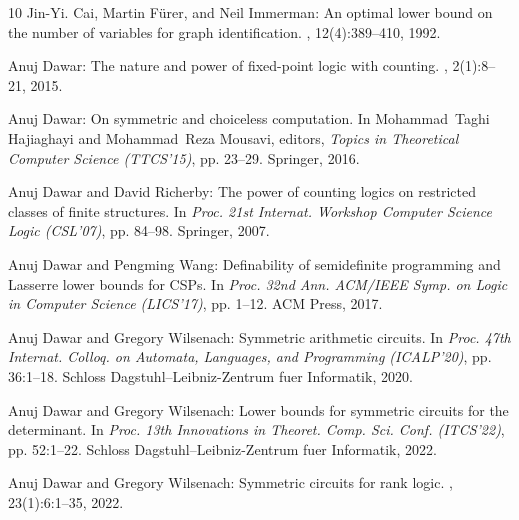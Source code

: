 \documentclass[11pt]{article}
\begin{document}
\begin{thebibliography}{10}
{\sc Jin-Yi. Cai, Martin F\"{u}rer, and Neil Immerman}: An optimal lower bound
  on the number of variables for graph identification.
, 12(4):389--410, 1992.
\newblock [\epfmtdoi{10.1007/BF01305232}]

{\sc Anuj Dawar}: The nature and power of fixed-point logic with counting.
, 2(1):8--21, 2015.
\newblock [\epfmtdoi{10.1145/2728816.2728820}]

{\sc Anuj Dawar}: On symmetric and choiceless computation.
\newblock In {\sc Mohammad~Taghi Hajiaghayi and Mohammad~Reza Mousavi},
  editors, {\em Topics in Theoretical Computer Science (TTCS'15)}, pp. 23--29.
  Springer, 2016.
\newblock [\epfmtdoi{10.1007/978-3-319-28678-5\_2}]

{\sc Anuj Dawar and David Richerby}: The power of counting logics on restricted
  classes of finite structures.
\newblock In {\em Proc. 21st Internat. Workshop Computer Science Logic
  (CSL'07)}, pp. 84--98. Springer, 2007.
\newblock [\epfmtdoi{10.1007/978-3-540-74915-8\_10}]

{\sc Anuj Dawar and Pengming Wang}: Definability of semidefinite programming
  and {L}asserre lower bounds for {CSP}s.
\newblock In {\em Proc. 32nd Ann. ACM/IEEE Symp. on Logic in Computer Science
  (LICS'17)}, pp. 1--12. ACM Press, 2017.

{\sc Anuj Dawar and Gregory Wilsenach}: Symmetric arithmetic circuits.
\newblock In {\em Proc. 47th Internat. Colloq. on Automata, Languages, and
  Programming (ICALP'20)}, pp. 36:1--18. Schloss Dagstuhl--Leibniz-Zentrum fuer
  Informatik, 2020.

{\sc Anuj Dawar and Gregory Wilsenach}: Lower bounds for symmetric circuits for
  the determinant.
\newblock In {\em Proc. 13th Innovations in Theoret. Comp. Sci. Conf.
  (ITCS'22)}, pp. 52:1--22. Schloss Dagstuhl--Leibniz-Zentrum fuer Informatik,
  2022.

{\sc Anuj Dawar and Gregory Wilsenach}: Symmetric circuits for rank logic.
, 23(1):6:1--35, 2022.
\newblock [\epfmtdoi{10.1145/3476227}]


\end{thebibliography}
\end{document}
